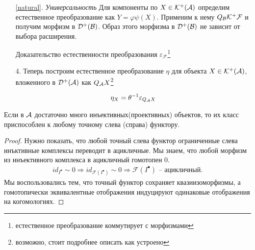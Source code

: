 \documentclass[../main.tex]{subfiles}
\begin{document}
\begin{itemize}
\item[ \ref{natural}.] \textit{Универсальность}
Для компоненты по $X \in \mathcal{K^+(A)}$ определим естественное преобразование как  $Y = \varphi\psi (X)$. Применим к нему $Q_{\mathcal{B}}\mathcal{K^+ F}$ и получим морфизм в $\mathcal{D^+(B)}$. Образ этого морфизма в $\mathcal{D^+(B)}$ не зависит от выбора расширения.
\bee
{}
\eee
Доказательство естественности преобразования $\varepsilon_{\mathcal{F}}$\footnote{естественное преобразование коммутирует с морфизмами}
\bee
{}
\eee
\bee
{}
\eee
\item[4.]Теперь построим естественное преобразование $\eta$ для объекта $X\in\mathcal{K^+(A)}$, вложенного в $\mathcal{D^+(A)}$ как $Q_{\mathcal{A}}X$\footnote{{\color{red}возможно, стоит подробнее описать как устроено }}
\bee
{}    
 \eee
 \begin{align*}
     \eta_{X} = \theta^{-1}\varepsilon_{Q_{\mathcal{A}}X}
 \end{align*}
 \end{itemize}
 \begin{to_claim}
Если в $\mathcal{A}$ достаточно много инъективных(проективных) объектов, то их класс приспособлен к любому точному слева (справа) функтору.
 \end{to_claim}
 \begin{proof}
 Нужно показать, что любой точный слева функтор ограниченные слева инъктивные комплексы переводит в ацикличные. Мы знаем, что любой морфизм из инъективного комплекса в ацикличный гомотопен 0. 
 \begin{align*}
     id_{I^\bullet} \sim 0 \Rightarrow id_{\mathcal{F}(I^\bullet)}\sim 0 \Rightarrow \mathcal{F}(I^\bullet) \text{ -- ацикличный.}
 \end{align*}
 Мы воспользовались тем, что точный функтор сохраняет квазиизоморфизмы, а гомотопически эквивалентные отображения индуцируют одинаковые отображения на когомологиях.
 \end{proof}
\end{document}
